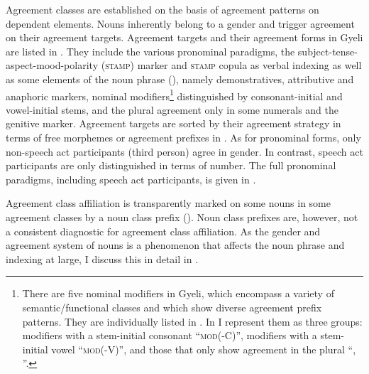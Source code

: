 Agreement classes are established on the basis of agreement patterns on dependent elements. Nouns inherently belong to a gender and trigger agreement on their agreement targets. Agreement targets and their agreement forms in Gyeli are listed in . They include the various pronominal paradigms, the subject-tense-aspect-mood-polarity (\textsc{stamp}) marker and \textsc{stamp} copula as verbal indexing as well as some elements of the noun phrase (), namely demonstratives, attributive and anaphoric markers, nominal modifiers\footnote{There are five nominal modifiers in Gyeli, which encompass a variety of semantic/functional classes and which show diverse agreement prefix patterns. They are individually listed in . In  I represent them as three groups: modifiers with a stem-initial consonant ``\textsc{mod}(-C)'', modifiers with a stem-initial vowel ``\textsc{mod}(-V)'', and those that only show agreement in the plural ``{\NUM}, {\GEN}''.} distinguished by consonant-initial and vowel-initial stems, and the plural agreement only in some numerals and the genitive marker. Agreement targets are sorted by their agreement strategy in terms of free morphemes or agreement prefixes in . As for pronominal forms, only non-speech act participants (third person) agree in gender. In contrast, speech act participants are only distinguished in terms of number. The full pronominal paradigms, including speech act participants, is given in .

Agreement class affiliation is transparently marked on some nouns in some agreement classes by a noun class prefix (). Noun class prefixes are, however, not a consistent diagnostic for agreement class affiliation.  As the gender and agreement system of nouns is a phenomenon that affects the noun phrase and indexing at large,  I discuss this in detail in .

